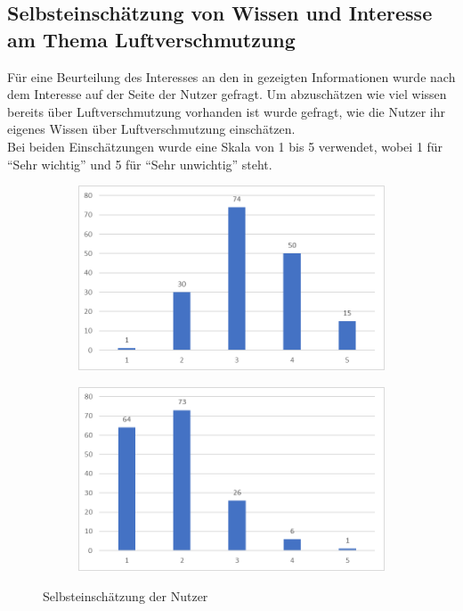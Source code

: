\subsection{Selbsteinschätzung von Wissen und Interesse am Thema Luftverschmutzung}
Für eine Beurteilung des Interesses an den in \softwarename gezeigten Informationen wurde nach dem Interesse auf der Seite der Nutzer gefragt.
Um abzuschätzen wie viel wissen bereits über \gls{Luftverschmutzung} vorhanden ist wurde gefragt, wie die Nutzer ihr eigenes Wissen über \gls{Luftverschmutzung} einschätzen.
\\
Bei beiden Einschätzungen wurde eine Skala von 1 bis 5 verwendet, wobei 1 für \enquote{Sehr wichtig} und 5 für \enquote{Sehr unwichtig} steht.
\\
\begin{figure}[h]
    \begin{subfigure}[c]{0.49\textwidth}
        \centering        
        \includegraphics[scale=0.2]{media/diagram/eigenesWissen.png}
    \end{subfigure}
    \begin{subfigure}[c]{0.49\textwidth}
        \centering        
        \includegraphics[scale=0.2]{media/diagram/WichtigkeitVonInfos.png}
    \end{subfigure}
    \caption{Selbsteinschätzung der Nutzer}
\end{figure}
